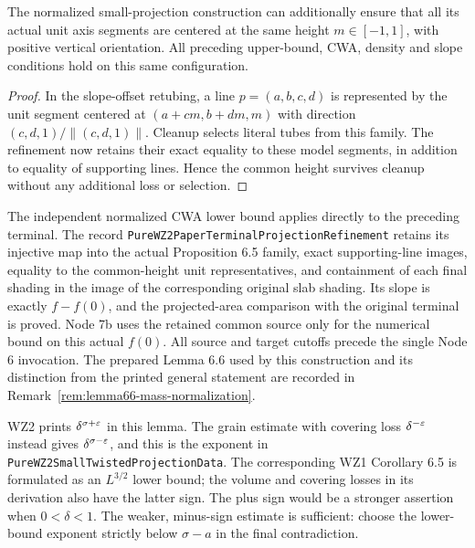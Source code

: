 \begin{lemma}
\label{lem:common-height-terminal}
\leanok
{}
The normalized small-projection construction can additionally ensure that
all its actual unit axis segments are centered at the same height
$m\in[-1,1]$, with positive vertical orientation. All preceding upper-bound,
CWA, density and slope conditions hold on this same configuration.
\end{lemma}
\begin{proof}
\leanok
In the slope-offset retubing, a line $p=(a,b,c,d)$ is represented by the
unit segment centered at $(a+cm,b+dm,m)$ with direction
$(c,d,1)/\|(c,d,1)\|$. Cleanup selects literal tubes from this family.
The refinement now retains their exact equality to these model segments,
in addition to equality of supporting lines. Hence the common height
survives cleanup without any additional loss or selection.
\end{proof}

\begin{remark}
\label{rem:terminal-compatibility}
The independent normalized CWA lower bound applies directly to the
preceding terminal. The record
\texttt{PureWZ2PaperTerminal\allowbreak ProjectionRefinement} retains its injective
map into the actual Proposition 6.5 family, exact supporting-line
images, equality to the common-height unit representatives, and containment of each final shading in the image of the
corresponding original slab shading. Its slope is exactly $f-f(0)$,
and the projected-area comparison with the original terminal is proved.
Node 7b uses the retained common source only for the numerical bound
on this actual $f(0)$. All source and target cutoffs precede the single
Node 6 invocation. The prepared Lemma 6.6 used by this construction and
its distinction from the printed general statement are recorded in
Remark~\ref{rem:lemma66-mass-normalization}.
\end{remark}

\begin{remark}
\label{rem:projection-sign}
WZ2 prints $\delta^{\sigma+\varepsilon}$ in this lemma. The grain estimate
with covering loss $\delta^{-\varepsilon}$ instead gives
$\delta^{\sigma-\varepsilon}$, and this is the exponent in
\texttt{PureWZ2SmallTwistedProjectionData}. The corresponding WZ1
Corollary 6.5 is formulated as an $L^{3/2}$ lower bound; the volume
and covering losses in its derivation also have the latter sign.
The plus sign would be a stronger assertion when $0<\delta<1$.
The weaker, minus-sign estimate is sufficient: choose the lower-bound
exponent strictly below $\sigma-a$ in the final contradiction.
\end{remark}

